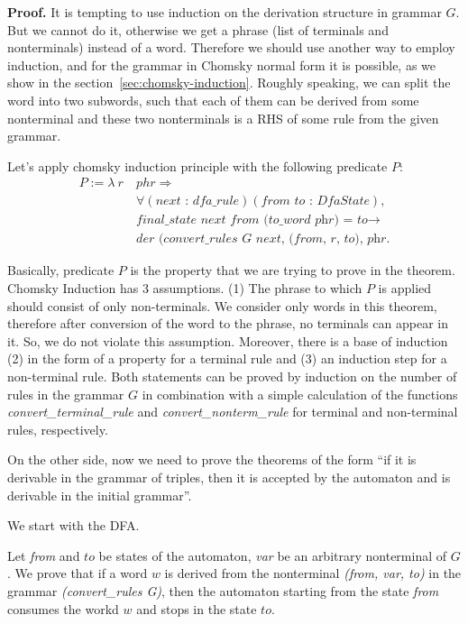 \textbf{Proof.}
It is tempting to use induction on the derivation structure in grammar $G$. But we cannot do it, otherwise we get a phrase (list of terminals and nonterminals) instead of a word. Therefore we should use another way to employ induction, and for the grammar in Chomsky normal form it is possible, as we show in the section~\ref{sec:chomsky-induction}. Roughly speaking, we can split the word into two subwords, such that each of them can be derived from some nonterminal and these two nonterminals is a RHS of some rule from the given grammar.

Let's apply chomsky induction principle with the following predicate $P$:
\begin{align*}
  P :=  \lambda \ r \ & phr \Rightarrow \\
        &\forall (\textit{next : dfa\_rule}) (\textit{from to : DfaState}), \\
        &\textit{final\_state next from (to\_word phr) = to} \to \\
        &\textit{der (convert\_rules G next, (from, r, to), phr}.
\end{align*}

Basically, predicate $P$ is the property that we are trying to prove in the theorem. Chomsky Induction has 3 assumptions.
(1) The phrase to which $P$ is applied should consist of only non-terminals. We consider only words in this theorem, therefore after conversion of the word to the phrase, no terminals can appear in it. So, we do not violate this assumption.
Moreover, there is a base of induction (2) in the form of a property for a terminal rule and (3) an induction step for a non-terminal rule.
Both statements can be proved by induction on the number of rules in the grammar $G$ in combination with a simple calculation of the functions \textit{convert\_terminal\_rule} and \textit{convert\_nonterm\_rule} for terminal and non-terminal rules, respectively.

On the other side, now we need to prove the theorems of the form  ``if it is derivable in the grammar of triples, then it is accepted by the automaton and is derivable in the initial grammar''.

We start with the DFA.

\begin{theorem}
	Let \textit{from} and $to$ be states of the automaton, \textit{var} be an arbitrary nonterminal of $G$. We prove that if a word $w$ is derived from the nonterminal \textit{(from, var, to)} in the grammar \textit{(convert\_rules G)}, then the automaton starting from the state \textit{from} consumes the workd $w$ and stops in the state $to$.
\end{theorem}

